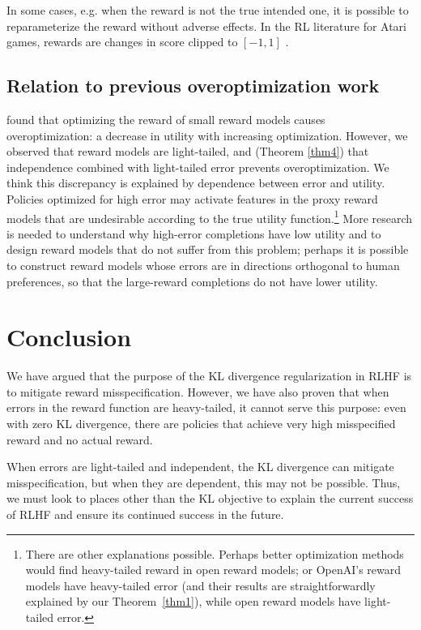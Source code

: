 \documentclass{article}
\begin{document}
In some cases, e.g. when the reward is not the true intended one, it is possible to reparameterize the reward without adverse effects. In the RL literature for Atari games, rewards are changes in score clipped to $[-1, 1]$ \citep{machado2018revisiting}.

\subsection{Relation to previous overoptimization work}

\citet{gao2023scaling} found that optimizing the reward of small reward models causes overoptimization: a decrease in utility with increasing optimization. However, we observed that reward models are light-tailed, and (Theorem \ref{thm4}) that independence combined with light-tailed error prevents overoptimization. We think this discrepancy is explained by dependence between error and utility. Policies optimized for high error may activate features in the proxy reward models that are undesirable according to the true utility function.\footnote{There are other explanations possible. Perhaps better optimization methods would find heavy-tailed reward in open reward models; or OpenAI's reward models have heavy-tailed error (and their results are straightforwardly explained by our Theorem~\ref{thm1}), while open reward models have light-tailed error.} %
More research is needed to understand why high-error completions have low utility and to design reward models that do not suffer from this problem; perhaps it is possible to construct reward models whose errors are in directions orthogonal to human preferences, so that the large-reward completions do not have lower utility.

\section{Conclusion}

We have argued that the purpose of the KL divergence regularization in RLHF is to mitigate reward misspecification. However, we have also proven that when errors in the reward function are heavy-tailed, it cannot serve this purpose: even with zero KL divergence, there are policies that achieve very high misspecified reward and no actual reward.

When errors are light-tailed and independent, the KL divergence can mitigate misspecification, but when they are dependent, this may not be possible. Thus, we must look to places other than the KL objective to explain the current success of RLHF and ensure its continued success in the future.
\end{document}
